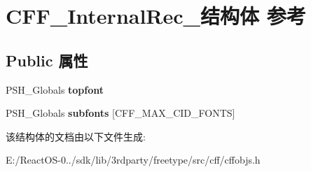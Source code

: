\hypertarget{struct_c_f_f___internal_rec__}{}\section{C\+F\+F\+\_\+\+Internal\+Rec\+\_\+结构体 参考}
\label{struct_c_f_f___internal_rec__}
\subsection*{Public 属性}
\begin{DoxyCompactItemize}
\item 
\mbox{\label{struct_c_f_f___internal_rec___a90029dad86da775688055435e92c976a}} 
P\+S\+H\+\_\+\+Globals {\bfseries topfont}
\item 
\mbox{\label{struct_c_f_f___internal_rec___a8d56228d8d069c1bc91448877d8451ed}} 
P\+S\+H\+\_\+\+Globals {\bfseries subfonts} \mbox{[}C\+F\+F\+\_\+\+M\+A\+X\+\_\+\+C\+I\+D\+\_\+\+F\+O\+N\+TS\mbox{]}
\end{DoxyCompactItemize}


该结构体的文档由以下文件生成\+:\begin{DoxyCompactItemize}
\item 
E\+:/\+React\+O\+S-\/0../sdk/lib/3rdparty/freetype/src/cff/cffobjs.\+h\end{DoxyCompactItemize}
